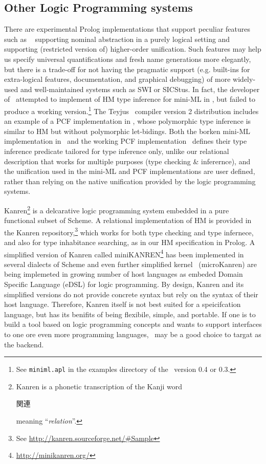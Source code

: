 \subsection{Other Logic Programming systems}\label{ssec:otherLP}
There are experimental Prolog implementations that support peculiar features
such as \aProlog\ \cite{cheney04iclp} supporting nominal abstraction in a purely
logical setting and \lProlog\ \cite{nadathur99cade} supporting (restricted
version of) higher-order unification. Such features may help us specify universal
quantifications and fresh name generations more elegantly, but there is a
trade-off for not having the pragmatic support (e.g. built-ins for extra-logical
features, documentation, and graphical debugging) of more widely-used and
well-maintained systems such as SWI or SICStus. In fact, the developer of
\aProlog\ attempted to implement of HM type inference for mini-ML in \aProlog,
but failed to produce a working version.\footnote{See \texttt{miniml.apl}
	in the examples directory of the \aProlog\ version 0.4 or 0.3.}
The Teyjus \lProlog\ compiler version 2 distribution includes an example of
a PCF implementation in \lProlog, whose polymorphic type inference is similar
to HM but without polymorphic let-bidings. Both the borken mini-ML implementation
in \aProlog\ and the working PCF implementation \lProlog\ defines their
type inference predicate tailored for type inference only, unlike our relational
description that works for multiple purposes (type checking \& inferernce),
and the unification used in the mini-ML and PCF implementations are user defined,
rather than relying on the native unification provided by the logic programming
systems.

Kanren\footnote{Kanren is a phonetic transcription of the Kanji word
	\begin{CJK}{UTF8}{min}{関連}\end{CJK} meaning ``\emph{relation}''.}
is a delcarative logic programming system embedded in a pure functional subset of
Scheme. A relational implementation of HM is provided in
the Kanren repository,\footnote{See \url{http://kanren.sourceforge.net/\#Sample}}
which works for both type checking and type infernece, and also for
type inhabitance searching, as in our HM specification in Prolog.
A simplified version of Kanren called miniKANREN\footnote{
	\url{http://minikanren.org/} } has been implemented in several dialects
of Scheme and even further simplified kernel \muKanren\ (microKanren)
\cite{microKanren} are being implemeted in growing number of host languages as
embeded Domain Specific Language (eDSL) for logic programming. By design, Kanren
and its simplified versions do not provide concrete syntax but rely on the syntax
of their host language. Therefore, Kanren itself is not best suited for
a speicifcation language, but has its benifits of being flexibile, simple, and
portable. If one is to build a tool based on logic programming concepts and wants
to support interfaces to one ore even more programming languages, \muKanren\ may
be a good choice to targat as the backend.


